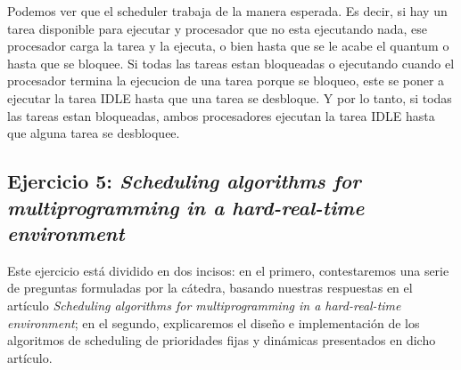Podemos ver que el scheduler trabaja de la manera esperada. Es decir, si hay un tarea disponible para ejecutar y procesador que no esta ejecutando nada,
ese procesador carga la tarea y la ejecuta, o bien hasta que se le acabe el quantum o hasta que se bloquee. Si todas las tareas estan bloqueadas 
o ejecutando cuando el procesador termina la ejecucion de una tarea porque se bloqueo, este se poner a ejecutar la tarea IDLE hasta que 
una tarea se desbloque. Y por lo tanto, si todas las tareas estan bloqueadas, ambos procesadores ejecutan la tarea IDLE hasta que alguna 
tarea se desbloquee.


\subsection{Ejercicio 5: \textit{Scheduling algorithms for multiprogramming in a hard-real-time environment}}
Este ejercicio est\'a dividido en dos incisos: en el primero, contestaremos una serie de preguntas formuladas por la c\'atedra, basando nuestras respuestas en el 
art\'iculo \textit{Scheduling algorithms for multiprogramming in a hard-real-time environment}; en el segundo, explicaremos el dise\~no e implementaci\'on 
de los algoritmos de scheduling de prioridades fijas y din\'amicas presentados en dicho art\'iculo.
